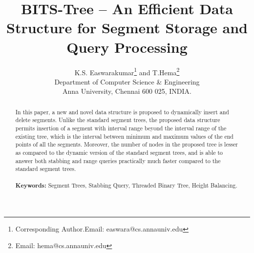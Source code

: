 \documentclass{article}
\begin{document}
\title{BITS-Tree -- An Efficient Data Structure for Segment Storage and Query Processing}
\author{K.S. Easwarakumar\thanks{Corresponding Author.Email: easwara@cs.annauniv.edu} and T.Hema\thanks{Email: hema@cs.annauniv.edu}\\Department of Computer Science \& Engineering\\ Anna University, Chennai 600 025, INDIA.}
\maketitle
\begin{abstract}
In this paper, a new and novel data structure is proposed to dynamically insert and delete segments. Unlike the standard segment trees\cite{b1}, the proposed data structure permits insertion of a segment with interval range beyond the interval range of the existing tree, which is the interval between minimum and maximum values of the end points of all the segments. Moreover, the number of nodes in the proposed tree is lesser as compared to the dynamic version of the standard segment trees, and is able to answer both stabbing and range queries practically much faster compared to the standard segment trees. \\~\\
{\bf Keywords:}
Segment Trees, Stabbing Query, Threaded Binary Tree, Height Balancing.
\end{abstract}  
\end{document}
